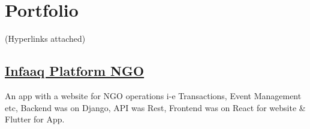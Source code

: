\documentclass[]{m abbas resume' 2022}
\begin{document}
\begin{minipage}[t]{0.50\textwidth}









	\section{Portfolio}
	 (Hyperlinks attached)

	\subsection{\href{https://github.com/smabbasht/infaaq}{\textbf{Infaaq Platform NGO}}}%
	An app with a website for NGO operations i-e Transactions,
	Event Management etc, Backend was on Django, API was Rest, Frontend was on React for website
	\& Flutter for App.


\end{minipage}
\end{document}
